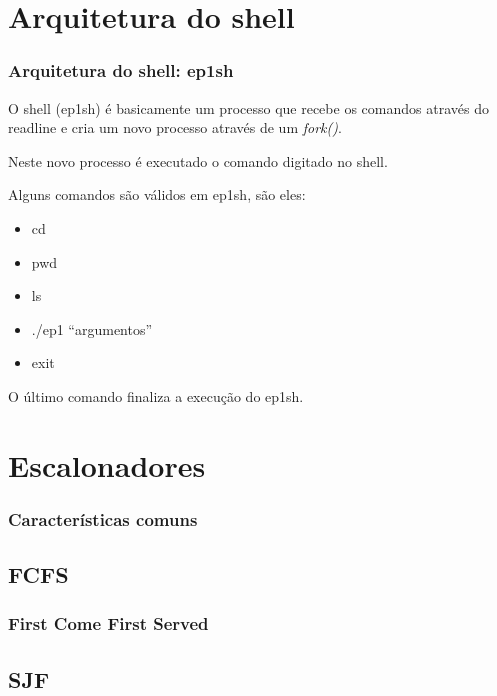 \documentclass{beamer}
\begin{document}
\section{Arquitetura do shell}
\begin{frame}
\frametitle{Arquitetura do shell: ep1sh}

O shell (ep1sh) é basicamente um processo que 
recebe os comandos através do readline e cria um novo processo através de um \emph{fork()}.

Neste novo processo é executado o comando digitado no shell.

Alguns comandos são válidos em ep1sh, são eles:

\begin{itemize}
\item cd
\item pwd
\item ls
\item ./ep1 ``argumentos''
\item exit
\end{itemize}

O último comando finaliza a execução do ep1sh.

\end{frame}
\section{Escalonadores} 


\begin{frame}
\frametitle{Características comuns}

\justifying
\end{frame}

\subsection{FCFS}
\begin{frame}
\frametitle{First Come First Served}

\justifying
\end{frame}

\subsection{SJF} 
\end{document}
